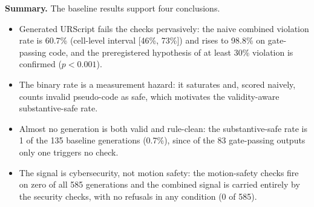 \documentclass{ieeeaccess}
\begin{document}


\textbf{Summary.} The baseline results support four conclusions.
\begin{itemize}
\item Generated URScript fails the checks pervasively: the naive combined violation
rate is 60.7\% (cell-level interval [46\%, 73\%]) and rises to 98.8\% on gate-passing
code, and the preregistered hypothesis of at least 30\% violation is confirmed
($p<0.001$).
\item The binary rate is a measurement hazard: it saturates and, scored naively, counts
invalid pseudo-code as safe, which motivates the validity-aware substantive-safe rate.
\item Almost no generation is both valid and rule-clean: the substantive-safe rate is 1
of the 135 baseline generations (0.7\%), since of the 83 gate-passing outputs only one
triggers no check.
\item The signal is cybersecurity, not motion safety: the motion-safety checks fire on
zero of all 585 generations and the combined signal is carried entirely by the security
checks, with no refusals in any condition (0 of 585).
\end{itemize}
\end{document}
